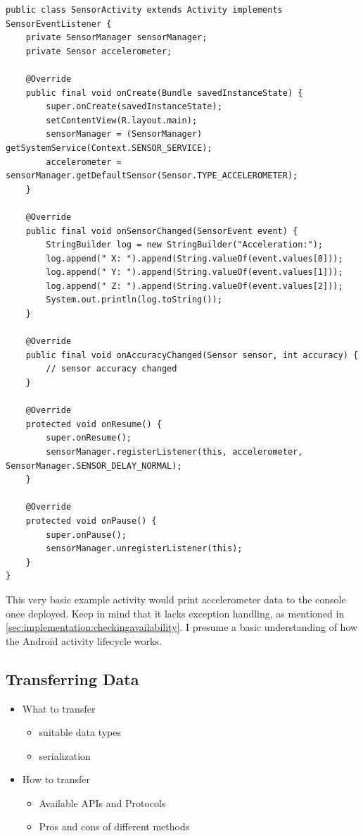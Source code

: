 \begin{lstlisting}[label=registersensoreventlistener]
public class SensorActivity extends Activity implements SensorEventListener {
	private SensorManager sensorManager;
	private Sensor accelerometer;

	@Override
	public final void onCreate(Bundle savedInstanceState) {
		super.onCreate(savedInstanceState);
		setContentView(R.layout.main);
		sensorManager = (SensorManager) getSystemService(Context.SENSOR_SERVICE);
		accelerometer = sensorManager.getDefaultSensor(Sensor.TYPE_ACCELEROMETER);
	}

	@Override
	public final void onSensorChanged(SensorEvent event) {
		StringBuilder log = new StringBuilder("Acceleration:");
		log.append(" X: ").append(String.valueOf(event.values[0]));
		log.append(" Y: ").append(String.valueOf(event.values[1]));
		log.append(" Z: ").append(String.valueOf(event.values[2]));
		System.out.println(log.toString());
	}

	@Override
	public final void onAccuracyChanged(Sensor sensor, int accuracy) {
		// sensor accuracy changed
	}

	@Override
	protected void onResume() {
		super.onResume();
		sensorManager.registerListener(this, accelerometer, SensorManager.SENSOR_DELAY_NORMAL);
	}

	@Override
	protected void onPause() {
		super.onPause();
		sensorManager.unregisterListener(this);
	}
}
\end{lstlisting}

This very basic example activity would print accelerometer data to the console once deployed.
Keep in mind that it lacks exception handling, as mentioned in \ref{sec:implementation:checkingavailability}.
I presume a basic understanding of how the Android activity\cite{androiddocs:activity} lifecycle works.

\subsection{Transferring Data}
\begin{itemize}[noitemsep]
	\item What to transfer
		\begin{itemize}
			\item suitable data types
			\item serialization
		\end{itemize}
	\item How to transfer
		\begin{itemize}
			\item Available APIs and Protocols
			\item Pros and cons of different methods
		\end{itemize}
\end{itemize}
\lipsum[1]
\lipsum[2]
\lipsum[3]
\lipsum[4]
\lipsum[5]
\lipsum[1]
\lipsum[2]
\lipsum[3]
\lipsum[4]
\lipsum[5]
\lipsum[2]
\lipsum[3]
\lipsum[4]
\lipsum[5]


\clearpage